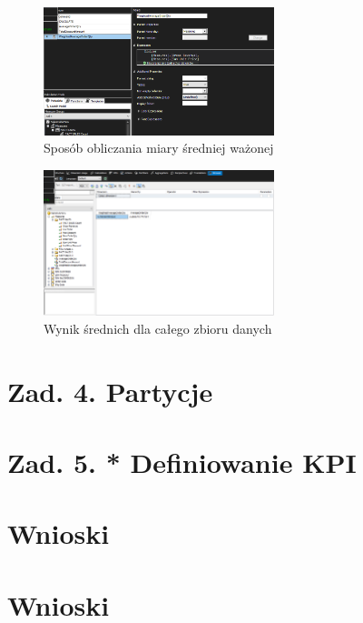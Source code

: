 \documentclass[a4paper,12pt]{article}
\begin{document}
\begin{figure}[H]
  \includegraphics[width=0.6\textwidth]{images/3_calculations_2.png}
  \caption{Sposób obliczania miary średniej ważonej}
\end{figure}

\begin{figure}[H]
  \includegraphics[width=0.6\textwidth]{images/3_result.png}
  \caption{Wynik średnich dla całego zbioru danych}
\end{figure}

\section{Zad. 4. Partycje}
\section{Zad. 5. * Definiowanie KPI}
\section{Wnioski}

\section{Wnioski}

\printbibliography
\end{document}
